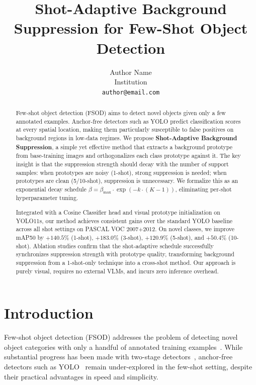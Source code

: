 \documentclass[10pt,twocolumn,letterpaper]{article}
\title{Shot-Adaptive Background Suppression for Few-Shot Object Detection}
\author{Author Name\\
Institution\\
{\tt\small author@email.com}
}
\begin{document}
\maketitle

\begin{abstract}
Few-shot object detection (FSOD) aims to detect novel objects given only a few annotated examples.
Anchor-free detectors such as YOLO predict classification scores at every spatial location,
making them particularly susceptible to false positives on background regions in low-data regimes.
We propose \textbf{Shot-Adaptive Background Suppression}, a simple yet effective method that
extracts a background prototype from base-training images and orthogonalizes each class prototype
against it. The key insight is that the suppression strength should decay with the number of
support samples: when prototypes are noisy (1-shot), strong suppression is needed; when prototypes
are clean (5/10-shot), suppression is unnecessary. We formalize this as an exponential decay
schedule $\beta = \beta_{\max} \cdot \exp(-k \cdot (K-1))$, eliminating per-shot hyperparameter
tuning.

Integrated with a Cosine Classifier head and visual prototype initialization on YOLO11s,
our method achieves consistent gains over the standard YOLO baseline across all shot settings
on PASCAL VOC 2007+2012. On novel classes, we improve mAP50 by $+140.5\%$ (1-shot),
$+183.0\%$ (3-shot), $+120.9\%$ (5-shot), and $+50.4\%$ (10-shot).
Ablation studies confirm that the shot-adaptive schedule successfully synchronizes
suppression strength with prototype quality, transforming background suppression from a
1-shot-only technique into a cross-shot method. Our approach is purely visual,
requires no external VLMs, and incurs zero inference overhead.
\end{abstract}

\section{Introduction}
\label{sec:intro}

Few-shot object detection (FSOD) addresses the problem of detecting novel object categories
with only a handful of annotated training examples~\cite{wang2020few,kang2019few}.
While substantial progress has been made with two-stage detectors~\cite{yan2019fsce,sun2021defrcn},
anchor-free detectors such as YOLO~\cite{jocher2023ultralytics} remain under-explored in the
few-shot setting, despite their practical advantages in speed and simplicity.
\end{document}

